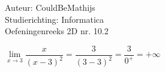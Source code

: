\documentclass[a4paper]{article}
\newcommand{\llim}{\lim\limits_}
\begin{document}
  
\noindent \large Auteur: CouldBeMathijs \\
\noindent \large Studierichting: Informatica\\
\noindent \large Oefeningenreeks 2D nr. 10.2\\

\medskip

\normalsize

$\llim{x \rightarrow 3} \dfrac{x}{\left( x - 3\right)^2} = \dfrac{3}{(3-3)^2} = \dfrac{3}{0^+} = + \infty$

\begin{thebibliography}{999}
\end{thebibliography}
\end{document}
